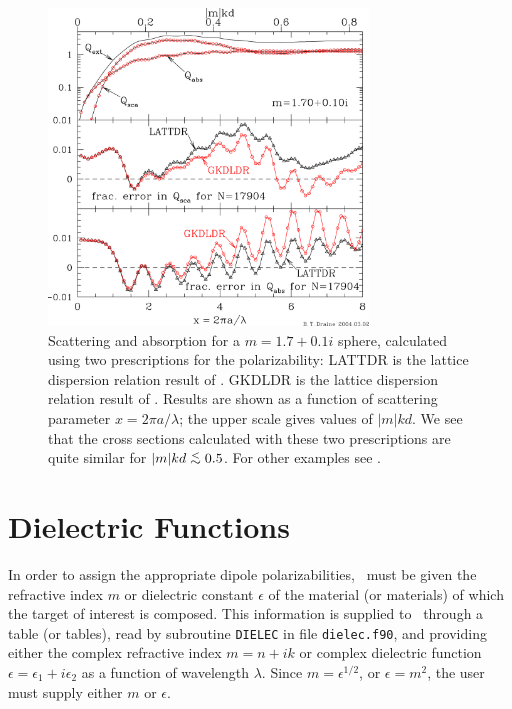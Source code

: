 \begin{figure}[t]
\begin{center}
\vspace*{-0.9cm}
\includegraphics[width=8.5cm]{fldr.png}
\vspace*{-2.2cm}
\caption{\footnotesize
         Scattering and absorption for a $m=1.7+0.1i$ sphere,
         calculated using two prescriptions for the polarizability:
	 LATTDR is the lattice dispersion relation result of 
         \citet{Draine+Goodman_1993}.
	 GKDLDR is the lattice dispersion relation result
	 of \citet{Gutkowicz-Krusin+Draine_2004}.
	 Results are shown as a function of scattering parameter
	 $x=2\pi a/\lambda$;
	 the upper scale gives values of $|m|kd$.
	 We see that the cross sections calculated with these two
	 prescriptions are quite similar for $|m|kd\ltsim 0.5$.
	 For other examples see \citet{Gutkowicz-Krusin+Draine_2004}.
	\label{fig:GKDLDR_vs_LATTDR}}
\end{center}
\end{figure}

\section{Dielectric Functions\label{sec:dielectric_func}}
In order to assign the appropriate dipole polarizabilities, \ddscatv\
must be given the refractive index $m$ or dielectric constant $\epsilon$
of the material (or
materials) of which the target of interest is composed.
This information is supplied to \ddscatv\
through a table (or tables), read by subroutine {\tt DIELEC} in file
{\tt dielec.f90}, and providing either the complex refractive index
$m=n+ik$ or complex dielectric function
$\epsilon=\epsilon_1+i\epsilon_2$ as a function of wavelength
$\lambda$.  Since $m=\epsilon^{1/2}$, or $\epsilon=m^2$, the user must
supply either $m$ or $\epsilon$.

